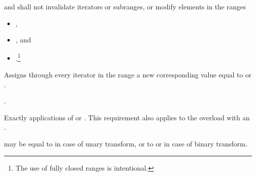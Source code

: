 \begin{itemdescr}
\pnum
\requires
{} and 
shall not invalidate iterators or subranges, or modify elements in the ranges
\begin{itemize}
\item {},
\item {}, and
\item {}.\footnote{The use of fully
closed ranges is intentional.}
\end{itemize}

\pnum
\effects
Assigns through every iterator
in the range
a new
corresponding value equal to
or
.

\pnum
\returns
{}.

\pnum
\complexity
Exactly
applications of
 or .  This requirement also applies to the overload
with an  .

\pnum
\remarks
{} may be equal to 
in case of unary transform,
or to  or 
in case of binary transform.
\end{itemdescr}

